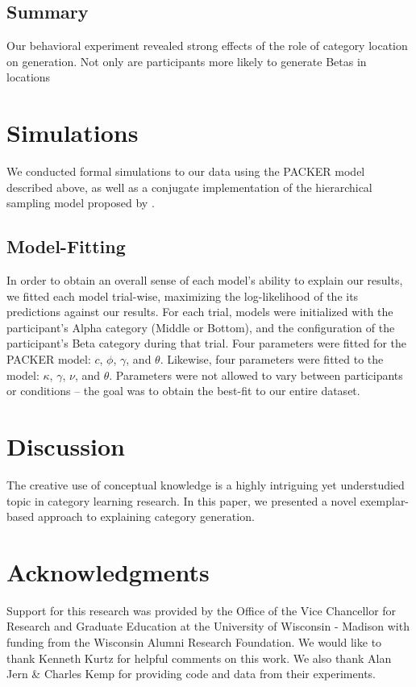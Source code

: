\documentclass[10pt,letterpaper]{article}
\begin{document}
\subsection{Summary}

Our behavioral experiment revealed strong effects of the role of category location on generation. Not only are participants more likely to generate Betas in locations

\section{Simulations}

We conducted formal simulations to our data using the PACKER model described above, as well as a conjugate implementation of the hierarchical sampling model proposed by \citet{jern2013probabilistic}.


\subsection{Model-Fitting}
In order to obtain an overall sense of each model's ability to explain our results, we fitted each model trial-wise, maximizing the log-likelihood of the its predictions against our results. For each trial, models were initialized with the participant's Alpha category (Middle or Bottom), and the configuration of the participant's Beta category during that trial. Four parameters were fitted for the PACKER model: $c$, $\phi$, $\gamma$, and $\theta$. Likewise, four parameters were fitted to the \cite{jern2013probabilistic} model: $\kappa$, $\gamma$, $\nu$, and $\theta$. Parameters were not allowed to vary between participants or conditions -- the goal was to obtain the best-fit to our entire dataset.

\section{Discussion}

The creative use of conceptual knowledge is a highly intriguing yet understudied topic in category learning research. In this paper, we presented a novel exemplar-based approach to explaining category generation.

\section{Acknowledgments}
Support for this research was provided by the Office of the Vice Chancellor for Research and Graduate Education at the University of Wisconsin - Madison with funding from the Wisconsin Alumni Research Foundation. We would like to thank Kenneth Kurtz for helpful comments on this work. We also thank Alan Jern \& Charles Kemp for providing code and data from their experiments.




\setlength{\bibleftmargin}{.025in}
\setlength{\bibindent}{-\bibleftmargin}

\end{document}

